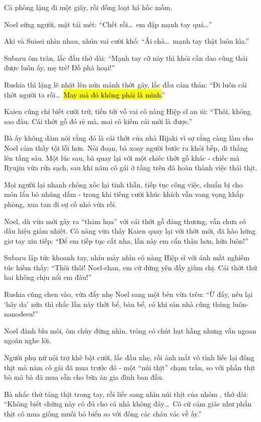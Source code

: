 \documentclass[../main.tex]{subfiles}
\begin{document}
Cả phòng lặng đi một giây, rồi đồng loạt há hốc mồm.

Noel sững người, mặt tái mét: ``Chết rồi\dots\ em đập mạnh tay quá\dots''

Aki và Suisei nhìn nhau, nhún vai cười khổ: ``Ái chà\dots\ mạnh tay thật luôn kìa.''

Subaru ôm trán, lắc đầu thở dài: ``Mạnh tay cỡ này thì khỏi cần dao cũng thái được luôn ấy, mẹ trẻ! Đồ phá hoại!''

Rushia thì lặng lẽ nhặt lên nửa mảnh thớt gãy, lắc đầu cảm thán: ``Đi luôn cái thớt người ta rồi\dots\ \hl{May mà đó không phải là mình.}''

Kaien cũng chỉ biết cười trừ, tiến tới vỗ vai cô nàng Hiệp sĩ an ủi: ``Thôi, không sao đâu. Cái thớt gỗ đó rẻ mà, mai cô kiếm cái mới là được.''

Bà ấy không dám nói rằng đó là cái thớt của nhà Hijaki vì sợ rằng càng làm cho Noel cảm thấy tội lỗi hơn. Nói đoạn, bà xoay người bước ra khỏi bếp, đi thẳng lên tầng sáu. Một lúc sau, bà quay lại với một chiếc thớt gỗ khác -  chiếc mà Ryujin vừa rửa sạch, sau khi năm cô gái ở tầng trên đã hoàn thành việc thái thịt.

Mọi người lại nhanh chóng xốc lại tinh thần, tiếp tục công việc, chuẩn bị cho món lẩu bò nhúng dấm - trong khi tiếng cười khúc khích vẫn vang vọng khắp phòng, xua tan đi sự cố nhỏ vừa rồi.

Noel, dù vừa mới gây ra ``thảm họa'' với cái thớt gỗ đáng thương, vẫn chưa có dấu hiệu giảm nhiệt. Cô nàng vừa thấy Kaien quay lại với thớt mới, đã hào hứng giơ tay xin tiếp: ``Để em tiếp tục cắt nha, lần này em cẩn thận hơn, hứa luôn!''

Subaru lập tức khoanh tay, nhíu mày nhìn cô nàng Hiệp sĩ với ánh mắt nghiêm túc hiếm thấy: ``Thôi thôi! Noel-chan, em cứ đứng yên đấy giùm chị. Cái thớt thứ hai không chịu nổi em đâu!''

Rushia cũng chen vào, vừa đẩy nhẹ Noel sang một bên vừa trêu: ``Ừ đấy, nếu lại `hây da' nữa thì chắc lần này thớt bể, bàn bể, có khi sàn nhà cũng thủng luôn-nanodesu!''

Noel đành bĩu môi, ôm chùy đứng nhìn, trông có chút hụt hẫng nhưng vẫn ngoan ngoãn nghe lời.

Người phụ nữ nội trợ khẽ bật cười, lắc đầu nhẹ, rồi ánh mắt vô tình liếc lại đống thịt mà năm cô gái đã mua trước đó - một ``núi thịt'' chạm trần, so với phần thịt bò mà bà đã mua sẵn cho bữa ăn gia đình ban đầu.

Bà nhấc thử tảng thịt trong tay, rồi liếc sang nhìn núi thịt của nhóm \hll, thở dài: ``Không biết chừng này có đủ cho cả nhà không đây\dots\ Cô cứ cảm giác như phần thịt cô mua giống muối bỏ biển so với đống các cháu vác về ấy.''
\end{document}

